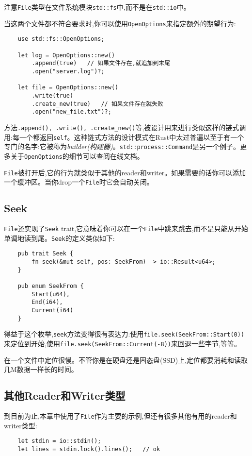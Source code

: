 注意\texttt{File}类型在文件系统模块\texttt{std::fs}中,而不是在\texttt{std::io}中。

当这两个文件都不符合要求时,你可以使用\texttt{OpenOptions}来指定额外的期望行为:
\begin{verbatim}
    use std::fs::OpenOptions;

    let log = OpenOptions::new()
        .append(true)   // 如果文件存在,就追加到末尾
        .open("server.log")?;

    let file = OpenOptions::new()
        .write(true)
        .create_new(true)   // 如果文件存在就失败
        .open("new_file.txt")?;
\end{verbatim}

方法\texttt{.append(), .write(), .create\_new()}等,被设计用来进行类似这样的链式调用:每一个都返回\texttt{self}。这种链式方法的设计模式在Rust中太过普遍以至于有一个专门的名字:它被称为\emph{builder(构建器)}。\texttt{std::process::Command}是另一个例子。更多关于\texttt{OpenOptions}的细节可以查阅在线文档。

\texttt{File}被打开后,它的行为就类似于其他的reader和writer。如果需要的话你可以添加一个缓冲区。当你drop一个\texttt{File}时它会自动关闭。

\subsection{Seek}
\texttt{File}还实现了\texttt{Seek} trait,它意味着你可以在一个\texttt{File}中跳来跳去,而不是只能从开始单调地读到尾。\texttt{Seek}的定义类似如下:
\begin{verbatim}
    pub trait Seek {
        fn seek(&mut self, pos: SeekFrom) -> io::Result<u64>;
    }

    pub enum SeekFrom {
        Start(u64),
        End(i64),
        Current(i64)
    }
\end{verbatim}

得益于这个枚举,\texttt{seek}方法变得很有表达力:使用\texttt{file.seek(SeekFrom::Start(0))}来定位到开始,使用\texttt{file.seek(SeekFrom::Current(-8))}来回退一些字节,等等。

在一个文件中定位很慢。不管你是在硬盘还是固态盘(SSD)上,定位都要消耗和读取几M数据一样长的时间。

\subsection{其他Reader和Writer类型}
到目前为止,本章中使用了\texttt{File}作为主要的示例,但还有很多其他有用的reader和writer类型:
\begin{verbatim}
    let stdin = io::stdin();
    let lines = stdin.lock().lines();   // ok
\end{verbatim}

